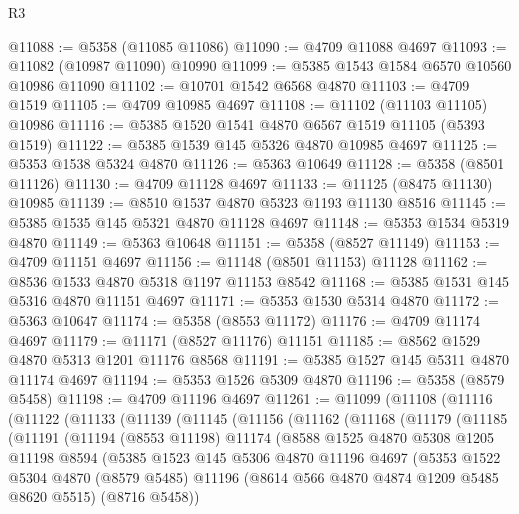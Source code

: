 \begin{lexlean}{R3}
\begin{coremodule}
@11088 := @5358 (@11085 @11086)
@11090 := @4709 @11088 @4697
@11093 := @11082 (@10987 @11090) @10990
@11099 := @5385 @1543 @1584 @6570 @10560 @10986 @11090
@11102 := @10701 @1542 @6568 @4870
@11103 := @4709 @1519
@11105 := @4709 @10985 @4697
@11108 := @11102 (@11103 @11105) @10986
@11116 := @5385 @1520 @1541 @4870 @6567 @1519 @11105 (@5393 @1519)
@11122 := @5385 @1539 @145 @5326 @4870 @10985 @4697
@11125 := @5353 @1538 @5324 @4870
@11126 := @5363 @10649
@11128 := @5358 (@8501 @11126)
@11130 := @4709 @11128 @4697
@11133 := @11125 (@8475 @11130) @10985
@11139 := @8510 @1537 @4870 @5323 @1193 @11130 @8516
@11145 := @5385 @1535 @145 @5321 @4870 @11128 @4697
@11148 := @5353 @1534 @5319 @4870
@11149 := @5363 @10648
@11151 := @5358 (@8527 @11149)
@11153 := @4709 @11151 @4697
@11156 := @11148 (@8501 @11153) @11128
@11162 := @8536 @1533 @4870 @5318 @1197 @11153 @8542
@11168 := @5385 @1531 @145 @5316 @4870 @11151 @4697
@11171 := @5353 @1530 @5314 @4870
@11172 := @5363 @10647
@11174 := @5358 (@8553 @11172)
@11176 := @4709 @11174 @4697
@11179 := @11171 (@8527 @11176) @11151
@11185 := @8562 @1529 @4870 @5313 @1201 @11176 @8568
@11191 := @5385 @1527 @145 @5311 @4870 @11174 @4697
@11194 := @5353 @1526 @5309 @4870
@11196 := @5358 (@8579 @5458)
@11198 := @4709 @11196 @4697
@11261 := @11099
    (@11108
      (@11116
        (@11122
          (@11133
            (@11139
              (@11145
                (@11156
                  (@11162
                    (@11168
                      (@11179
                        (@11185
                          (@11191
                            (@11194
                              (@8553 @11198)
                              @11174
                              (@8588
                                @1525
                                @4870
                                @5308
                                @1205
                                @11198
                                @8594
                                (@5385
                                  @1523
                                  @145
                                  @5306
                                  @4870
                                  @11196
                                  @4697
                                  (@5353
                                    @1522
                                    @5304
                                    @4870
                                    (@8579 @5485)
                                    @11196
                                    (@8614 @566 @4870 @4874 @1209 @5485 @8620 @5515)
                                    (@8716 @5458))

\end{coremodule}
\end{lexlean}

